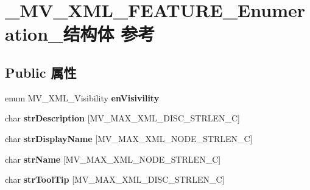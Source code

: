 \hypertarget{struct___m_v___x_m_l___f_e_a_t_u_r_e___enumeration__}{}\section{\+\_\+\+M\+V\+\_\+\+X\+M\+L\+\_\+\+F\+E\+A\+T\+U\+R\+E\+\_\+\+Enumeration\+\_\+结构体 参考}
\label{struct___m_v___x_m_l___f_e_a_t_u_r_e___enumeration__}
\subsection*{Public 属性}
\begin{DoxyCompactItemize}
\item 
\mbox{\label{struct___m_v___x_m_l___f_e_a_t_u_r_e___enumeration___ade23dc92a5dbbd6660eb72efe9976f13}} 
enum M\+V\+\_\+\+X\+M\+L\+\_\+\+Visibility {\bfseries en\+Visivility}
\item 
\mbox{\label{struct___m_v___x_m_l___f_e_a_t_u_r_e___enumeration___acdb62f655b7fc656047fe5b7dbf9e223}} 
char {\bfseries str\+Description} \mbox{[}M\+V\+\_\+\+M\+A\+X\+\_\+\+X\+M\+L\+\_\+\+D\+I\+S\+C\+\_\+\+S\+T\+R\+L\+E\+N\+\_\+C\mbox{]}
\item 
\mbox{\label{struct___m_v___x_m_l___f_e_a_t_u_r_e___enumeration___a7377a1886c39c1db69b643496d0aa325}} 
char {\bfseries str\+Display\+Name} \mbox{[}M\+V\+\_\+\+M\+A\+X\+\_\+\+X\+M\+L\+\_\+\+N\+O\+D\+E\+\_\+\+S\+T\+R\+L\+E\+N\+\_\+C\mbox{]}
\item 
\mbox{\label{struct___m_v___x_m_l___f_e_a_t_u_r_e___enumeration___a80454fe439f794f3221001e339490d4a}} 
char {\bfseries str\+Name} \mbox{[}M\+V\+\_\+\+M\+A\+X\+\_\+\+X\+M\+L\+\_\+\+N\+O\+D\+E\+\_\+\+S\+T\+R\+L\+E\+N\+\_\+C\mbox{]}
\item 
\mbox{\label{struct___m_v___x_m_l___f_e_a_t_u_r_e___enumeration___ac40e2dad99ad42b06d481b22fd20f8bb}} 
char {\bfseries str\+Tool\+Tip} \mbox{[}M\+V\+\_\+\+M\+A\+X\+\_\+\+X\+M\+L\+\_\+\+D\+I\+S\+C\+\_\+\+S\+T\+R\+L\+E\+N\+\_\+C\mbox{]}

\end{DoxyCompactItemize}
